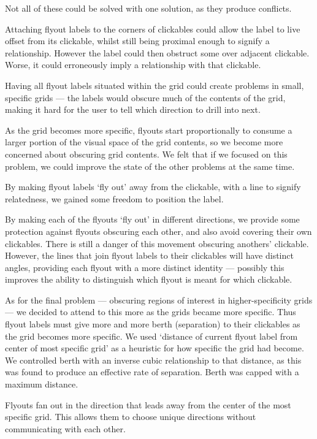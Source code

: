 \documentclass[11pt,openright,a4paper]{report}
\begin{document}
Not all of these could be solved with one solution, as they produce conflicts.

Attaching flyout labels to the corners of clickables could allow the label to live offset from its clickable, whilst still being proximal enough to signify a relationship. However the label could then obstruct some over adjacent clickable. Worse, it could erroneously imply a relationship with that clickable.

Having all flyout labels situated within the grid could create problems in small, specific grids --- the labels would obscure much of the contents of the grid, making it hard for the user to tell which direction to drill into next.

As the grid becomes more specific, flyouts start proportionally to consume a larger portion of the visual space of the grid contents, so we become more concerned about obscuring grid contents. We felt that if we focused on this problem, we could improve the state of the other problems at the same time.

By making flyout labels `fly out' away from the clickable, with a line to signify relatedness, we gained some freedom to position the label.

By making each of the flyouts `fly out' in different directions, we provide some protection against flyouts obscuring each other, and also avoid covering their own clickables. There is still a danger of this movement obscuring anothers' clickable. However, the lines that join flyout labels to their clickables will have distinct angles, providing each flyout with a more distinct identity --- possibly this improves the ability to distinguish which flyout is meant for which clickable.

As for the final problem --- obscuring regions of interest in higher-specificity grids --- we decided to attend to this more as the grids became more specific. Thus flyout labels must give more and more berth (separation) to their clickables as the grid becomes more specific. We used `distance of current flyout label from center of most specific grid' as a heuristic for how specific the grid had become. We controlled berth with an inverse cubic relationship to that distance, as this was found to produce an effective rate of separation. Berth was capped with a maximum distance.

Flyouts fan out in the direction that leads away from the center of the most specific grid. This allows them to choose unique directions without communicating with each other.
\end{document}
